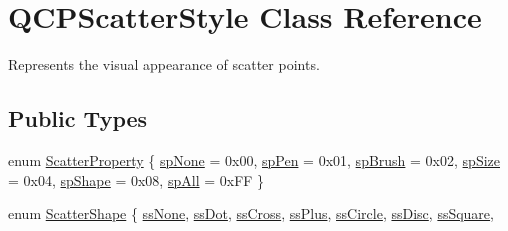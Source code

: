 \hypertarget{classQCPScatterStyle}{}\section{Q\+C\+P\+Scatter\+Style Class Reference}
\label{classQCPScatterStyle}


Represents the visual appearance of scatter points.  


\subsection*{Public Types}
\begin{DoxyCompactItemize}
\item 
enum \hyperlink{classQCPScatterStyle_a8974f6a20f8f6eea7781f0e6af9deb46}{Scatter\+Property} \{ \newline
\hyperlink{classQCPScatterStyle_a8974f6a20f8f6eea7781f0e6af9deb46a5891be10bea382fad6c20f7737a2dd90}{sp\+None} = 0x00, 
\hyperlink{classQCPScatterStyle_a8974f6a20f8f6eea7781f0e6af9deb46aa04d012e7c03e455db2b68fdd55c2a04}{sp\+Pen} = 0x01, 
\hyperlink{classQCPScatterStyle_a8974f6a20f8f6eea7781f0e6af9deb46af0499b1fc04de2dcc7e47ff0ef75c904}{sp\+Brush} = 0x02, 
\hyperlink{classQCPScatterStyle_a8974f6a20f8f6eea7781f0e6af9deb46a553ae95798ace9a328c7cd62045260b0}{sp\+Size} = 0x04, 
\newline
\hyperlink{classQCPScatterStyle_a8974f6a20f8f6eea7781f0e6af9deb46a19c224563adb42c55fb8b7ae6904411b}{sp\+Shape} = 0x08, 
\hyperlink{classQCPScatterStyle_a8974f6a20f8f6eea7781f0e6af9deb46af62509c0409467f387234274762e6f69}{sp\+All} = 0x\+FF
 \}
\item 
enum \hyperlink{classQCPScatterStyle_adb31525af6b680e6f1b7472e43859349}{Scatter\+Shape} \{ \newline
\hyperlink{classQCPScatterStyle_adb31525af6b680e6f1b7472e43859349abd144c291ca274f77053ec68cab6c022}{ss\+None}, 
\hyperlink{classQCPScatterStyle_adb31525af6b680e6f1b7472e43859349a06e15a735b79093a1d999c0374fa3aa1}{ss\+Dot}, 
\hyperlink{classQCPScatterStyle_adb31525af6b680e6f1b7472e43859349a9eacd60f059dc3ef71bf249f515a6fe4}{ss\+Cross}, 
\hyperlink{classQCPScatterStyle_adb31525af6b680e6f1b7472e43859349a2d7f1d3c1a148b9d9d17f2fd9cae5eb7}{ss\+Plus}, 
\newline
\hyperlink{classQCPScatterStyle_adb31525af6b680e6f1b7472e43859349a7c92a110880d0ef2170dff3a5b4f7779}{ss\+Circle}, 
\hyperlink{classQCPScatterStyle_adb31525af6b680e6f1b7472e43859349a281fe1434696dcbab3aa6b9ccfbb09e9}{ss\+Disc}, 
\hyperlink{classQCPScatterStyle_adb31525af6b680e6f1b7472e43859349a279e48703ddc9f1cf4a61d3e2817ab3c}{ss\+Square}, 

\end{DoxyCompactItemize}
